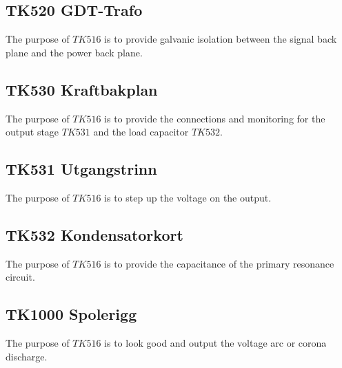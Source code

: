 \subsection*{TK520 GDT-Trafo}
The purpose of $TK516$ is to provide galvanic isolation between the signal back plane and the power back plane.

\subsection*{TK530 Kraftbakplan}
The purpose of $TK516$ is to provide the connections and monitoring for the output stage $TK531$ and the load capacitor $TK532$.

\subsection*{TK531 Utgangstrinn}
The purpose of $TK516$ is to step up the voltage on the output.

\subsection*{TK532 Kondensatorkort}
The purpose of $TK516$ is to provide the capacitance of the primary resonance circuit.

\subsection{TK1000 Spolerigg}
The purpose of $TK516$ is to look good and output the voltage arc or corona discharge.